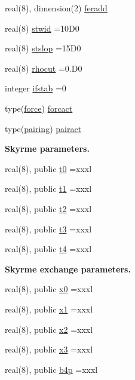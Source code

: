 \begin{DoxyCompactItemize}
real(8), dimension(2) \hyperlink{namespacedynpar_af4ed4af756b4cf0507655adc548a0439}{feradd}
\item 
real(8) \hyperlink{namespacedynpar_a7636644e83a92739e1cf1071ccfd6f6d}{stwid} =10\+D0
\item 
real(8) \hyperlink{namespacedynpar_a35401f37918ab6873a9141343fd0ecc7}{stslop} =15\+D0
\item 
real(8) \hyperlink{namespacedynpar_ad4f057977601477d6541c2cca2dd27d4}{rhocut} =0.\+D0
\item 
integer \hyperlink{namespacedynpar_afab130173434abc128a531270a004014}{ifstab} =0
\item 
type(\hyperlink{structdynpar_1_1force}{force}) \hyperlink{namespacedynpar_a3e425cbc7896d63e7533e2c878976405}{forcact}
\item 
type(\hyperlink{structdynpar_1_1pairing}{pairing}) \hyperlink{namespacedynpar_a924d3279ad523c4e4ce6db488f53b781}{pairact}
\end{DoxyCompactItemize}
\begin{Indent}{\bf Skyrme parameters.}\par
\begin{DoxyCompactItemize}
\item 
real(8), public \hyperlink{namespacedynpar_a2b1194ee3dd6225c16841f068e72dcb1}{t0} =xxxl
\item 
real(8), public \hyperlink{namespacedynpar_ad299be5ee883b4d581da154ccd7e6122}{t1} =xxxl
\item 
real(8), public \hyperlink{namespacedynpar_a7f9cd17747b9e2e1cf0b61fa6bd67f95}{t2} =xxxl
\item 
real(8), public \hyperlink{namespacedynpar_abd8caac07066c74344144e7013b2fae8}{t3} =xxxl
\item 
real(8), public \hyperlink{namespacedynpar_afba19ad7aa265b1118bb2717342c26c1}{t4} =xxxl
\end{DoxyCompactItemize}
\end{Indent}
\begin{Indent}{\bf Skyrme exchange parameters.}\par
\begin{DoxyCompactItemize}
\item 
real(8), public \hyperlink{namespacedynpar_a7461eb81aceaa783be48352dd5139d52}{x0} =xxxl
\item 
real(8), public \hyperlink{namespacedynpar_a1795899561c89510221eb9813958b454}{x1} =xxxl
\item 
real(8), public \hyperlink{namespacedynpar_ab79dff0c71924920f22bdb65728854d1}{x2} =xxxl
\item 
real(8), public \hyperlink{namespacedynpar_a342536ef5b89d8d63d638f7e1545c34d}{x3} =xxxl
\item 
real(8), public \hyperlink{namespacedynpar_a22a91c088555645f2484f961d89687a0}{b4p} =xxxl
\end{DoxyCompactItemize}
\end{Indent}
